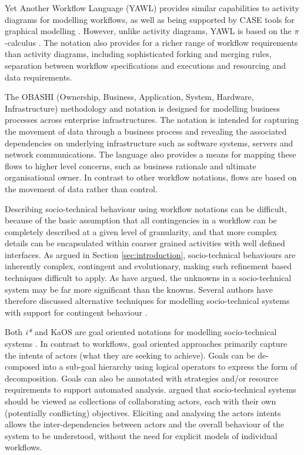 \documentclass{sig-alternate}
\newcommand{\picalc}{\(\pi\)-calculus }
\begin{document}
Yet Another Workflow Language (YAWL) provides similar capabilities to activity diagrams for modelling workflows, as well
as being supported by CASE tools for graphical modelling \citep{hofstede2010yawl}.  However, unlike activity diagrams,
YAWL is based on the \picalc\citep{Aalst2004}.  The notation also provides for a richer range of workflow requirements
than activity diagrams, including sophisticated forking and merging rules, separation between workflow specifications
and executions and resourcing and data requirements.

The OBASHI (Ownership, Business, Application, System, Hardware, Infrastructure) methodology and notation
\citep{obashimethodology} is designed for modelling business processes across enterprise infrastructures.  The notation
is intended for capturing the movement of data through a business process and revealing the associated dependencies on
underlying infrastructure such as software systems, servers and network communications.  The language also provides a
means for mapping these flows to higher level concerns, such as business rationale and ultimate organisational owner. In
contrast to other workflow notations, flows are based on the movement of data rather than control.


Describing socio-technical behaviour using workflow notations can be difficult, because of the basic assumption that all
contingencies in a workflow can be completely described at a given level of granularity, and that more complex details
can be encapsulated within coarser grained activities with well defined interfaces.  As argued in Section
\ref{sec:introduction}, socio-technical behaviours are inherently complex, contingent and evolutionary, making such
refinement based techniques difficult to apply.  As \citet{israilidis13ignorance} have argued, the unknowns in a
socio-technical system may be far more significant than the knowns. Several authors have therefore discussed alternative
techniques for modelling socio-technical systems with support for contingent behaviour
\citep{yu1995,dardenne93goal,Herrmann1999,sommerville09deriving}.

Both \emph{i*}\citet{yu1995} and KaOS \citet{dardenne93goal} are goal oriented notations for modelling socio-technical
systems \citep{Werneck2009}.  In contrast to workflows, goal oriented approaches primarily capture the intents of actors
(what they are seeking to achieve).  Goals can be de-composed into a sub-goal hierarchy using logical operators to
express the form of decomposition. Goals can also be annotated with strategies and/or resource requirements to support
automated analysis.  \citeauthor{yu1995} argued that socio-technical systems should be viewed as collections of
collaborating actors, each with their own (potentially conflicting) objectives.  Eliciting and analysing the actors
intents allows the inter-dependencies between actors and the overall behaviour of the system to be understood, without
the need for explicit models of individual workflows.
\end{document}
